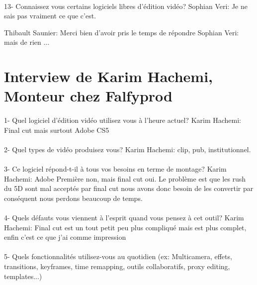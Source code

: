 \paragraph{}
13- Connaissez vous certains logiciels libres d'édition vidéo?
Sophian Veri: Je ne sais pas vraiment ce que c'est.

Thibault Saunier: Merci bien d'avoir pris le temps de répondre
    Sophian Veri: mais de rien
    ...

\section{Interview de Karim Hachemi, Monteur chez Falfyprod}

\paragraph{}
1-  Quel logiciel d'édition vidéo utilisez vous à l'heure actuel?
Karim Hachemi: Final cut mais surtout Adobe CS5

\paragraph{}
2- Quel types de vidéo produisez vous?
Karim Hachemi: clip, pub, institutionnel.

\paragraph{}
3- Ce logiciel répond-t-il à tous vos besoins en terme de montage?
Karim Hachemi: Adobe Première non, mais final cut oui. Le problème est que les
rush du 5D sont mal acceptés par final cut nous avons donc besoin de les
convertir par conséquent nous perdons beaucoup de temps.
\paragraph{}
4- Quels défauts vous viennent à l'esprit quand vous pensez à cet outil?
Karim Hachemi: Final cut est un tout petit peu plus compliqué mais
est plus complet, enfin c'est ce que j'ai comme impression


\paragraph{}
5-  Quels fonctionnalités utilisez-vous au quotidien (ex: Multicamera, effets,
transitions, keyframes, time remapping, outils collaboratifs, proxy
editing, templates...)

